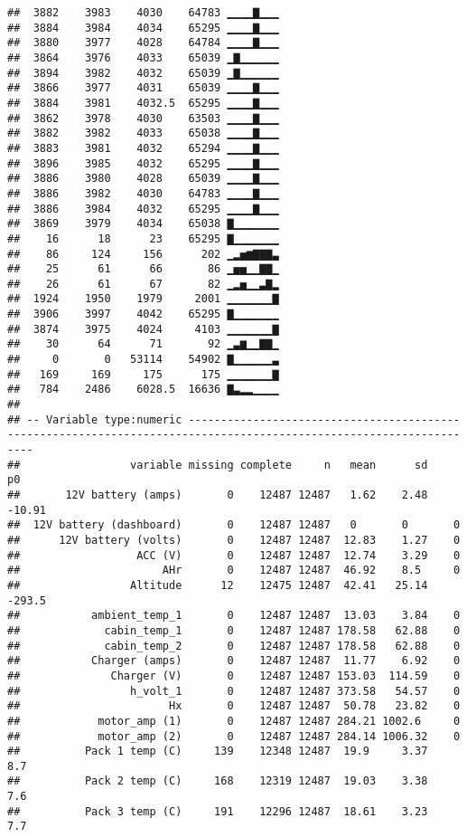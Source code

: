 \documentclass[]{article}
\begin{document}
\begin{verbatim}
##  3882    3983    4030    64783 ▁▁▁▁▇▁▁▁
##  3884    3984    4034    65295 ▁▁▁▁▇▁▁▁
##  3880    3977    4028    64784 ▁▁▁▁▇▁▁▁
##  3864    3976    4033    65039 ▁▇▁▁▁▁▁▁
##  3894    3982    4032    65039 ▁▇▁▁▁▁▁▁
##  3866    3977    4031    65039 ▁▁▁▁▇▁▁▁
##  3884    3981    4032.5  65295 ▁▁▁▁▇▁▁▁
##  3862    3978    4030    63503 ▁▁▁▁▇▁▁▁
##  3882    3982    4033    65038 ▁▁▁▁▇▁▁▁
##  3883    3981    4032    65294 ▁▁▁▁▇▁▁▁
##  3896    3985    4032    65295 ▁▁▁▁▇▁▁▁
##  3886    3980    4028    65039 ▁▁▁▁▇▁▁▁
##  3886    3982    4030    64783 ▁▁▁▁▇▁▁▁
##  3886    3984    4032    65295 ▁▁▁▁▇▁▁▁
##  3869    3979    4034    65038 ▇▁▁▁▁▁▁▁
##    16      18      23    65295 ▇▁▁▁▁▁▁▁
##    86     124     156      202 ▁▂▅▆▇▇▇▃
##    25      61      66       86 ▁▅▅▁▁▇▇▁
##    26      61      67       82 ▁▂▅▁▁▃▇▂
##  1924    1950    1979     2001 ▁▁▁▁▁▁▁▇
##  3906    3997    4042    65295 ▇▁▁▁▁▁▁▁
##  3874    3975    4024     4103 ▁▁▁▁▁▁▁▇
##    30      64      71       92 ▁▃▆▁▁▇▇▁
##     0       0   53114    54902 ▇▁▁▁▁▁▁▃
##   169     169     175      175 ▁▁▁▁▁▁▁▇
##   784    2486    6028.5  16636 ▇▃▂▂▁▁▁▁
## 
## -- Variable type:numeric --------------------------------------------------------------------------------------------------------------------
##                 variable missing complete     n   mean      sd      p0
##       12V battery (amps)       0    12487 12487   1.62    2.48  -10.91
##  12V battery (dashboard)       0    12487 12487   0       0       0   
##      12V battery (volts)       0    12487 12487  12.83    1.27    0   
##                  ACC (V)       0    12487 12487  12.74    3.29    0   
##                      AHr       0    12487 12487  46.92    8.5     0   
##                 Altitude      12    12475 12487  42.41   25.14 -293.5 
##           ambient_temp_1       0    12487 12487  13.03    3.84    0   
##             cabin_temp_1       0    12487 12487 178.58   62.88    0   
##             cabin_temp_2       0    12487 12487 178.58   62.88    0   
##           Charger (amps)       0    12487 12487  11.77    6.92    0   
##              Charger (V)       0    12487 12487 153.03  114.59    0   
##                 h_volt_1       0    12487 12487 373.58   54.57    0   
##                       Hx       0    12487 12487  50.78   23.82    0   
##            motor_amp (1)       0    12487 12487 284.21 1002.6     0   
##            motor_amp (2)       0    12487 12487 284.14 1006.32    0   
##          Pack 1 temp (C)     139    12348 12487  19.9     3.37    8.7 
##          Pack 2 temp (C)     168    12319 12487  19.03    3.38    7.6 
##          Pack 3 temp (C)     191    12296 12487  18.61    3.23    7.7 

\end{verbatim}
\end{document}
